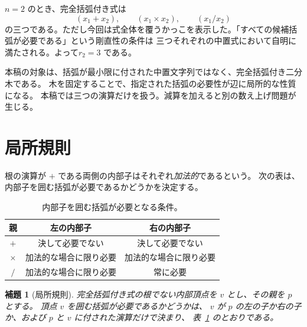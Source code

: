 \documentclass[11pt]{ltjsarticle}
\newtheorem{lemma}[theorem]{補題}
\begin{document}
$n=2$ のとき、完全括弧付き式は
\[
 (x_1+x_2),\qquad
 (x_1\times x_2),\qquad
 (x_1/x_2)
\]
の三つである。ただし今回は式全体を覆うかっこを表示した。「すべての候補括弧が必要である」という剛直性の条件は
三つそれぞれの中置式において自明に満たされる。よって$ r_2=3$
である。

本稿の対象は、括弧が最小限に付された中置文字列ではなく、完全括弧付き二分木である。
木を固定することで、指定された括弧の必要性が辺に局所的な性質になる。
本稿では三つの演算だけを扱う。減算を加えると別の数え上げ問題が生じる。

\section{局所規則}

根の演算が $+$ である両側の内部子はそれぞれ\emph{加法的}であるという。
次の表は、内部子を囲む括弧が必要であるかどうかを決定する。

\begin{table}[ht]
\centering
\small
\begin{tabular}{ccc}
\toprule
親 & 左の内部子 & 右の内部子 \\
\midrule
$+$      & 決して必要でない & 決して必要でない \\
$\times$ & 加法的な場合に限り必要 & 加法的な場合に限り必要 \\
$/$      & 加法的な場合に限り必要 & 常に必要 \\
\bottomrule
\end{tabular}
\caption{内部子を囲む括弧が必要となる条件。}
\label{tab:local}
\end{table}

\begin{lemma}[局所規則]\label{lem:local}
完全括弧付き式の根でない内部頂点を $v$ とし、その親を $p$ とする。
頂点 $v$ を囲む括弧が必要であるかどうかは、
$v$ が $p$ の左の子か右の子か、および $p$ と $v$ に付された演算だけで決まり、
表~\ref{tab:local} のとおりである。
\end{lemma}
\end{document}
